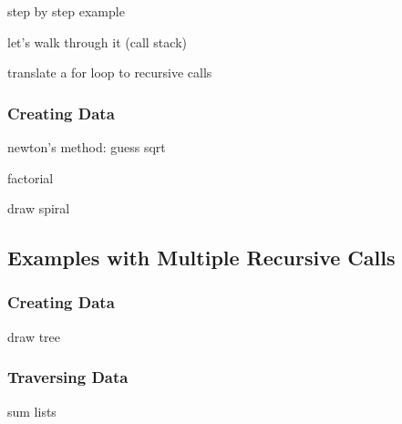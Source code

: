 \documentclass[11pt]{cselabheader}
\begin{document}
step by step example

let's walk through it
(call stack)

translate a for loop to recursive calls

\begin{python3code}

\end{python3code}

\begin{python3code}

\end{python3code}

\subsubsection{Creating Data}
newton's method: guess sqrt

\begin{python3code}

\end{python3code}

factorial

\begin{python3code}

\end{python3code}

draw spiral

\begin{python3code}

\end{python3code}

\subsection{Examples with Multiple Recursive Calls}
\subsubsection{Creating Data}
draw tree

\begin{python3code}

\end{python3code}

\subsubsection{Traversing Data}
sum lists

\begin{python3code}

\end{python3code}
\end{document}
